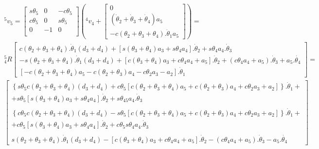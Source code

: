 \begin{equation}
\begin{gathered}
    ^5v_5 = \begin{bmatrix}
        s\theta_5 & 0 & -c\theta_5 \\
        c\theta_5 & 0 & s\theta_5 \\
        0 & -1 & 0 \\
    \end{bmatrix} \left( ^4v_4 + 
    \begin{bmatrix}
        0 \\ 
        (\dot{\theta}_2 + \dot{\theta}_3 + \dot{\theta}_4)a_5 \\ 
        -c(\theta_2+\theta_3+\theta_4).\dot{\theta}_1a_5
    \end{bmatrix} \right) = \\
    ^5_4R
    \begin{bmatrix}
        c(\theta_2 + \theta_3 + \theta_4).\dot{\theta}_1(d_3+d_4) + [s(\theta_3+\theta_4)a_3 + s\theta_4a_4].\dot{\theta}_2 + s\theta_4a_4.\dot{\theta}_3 \\ 
        -s(\theta_2 + \theta_3 + \theta_4).\dot{\theta}_1(d_3+d_4) + [c(\theta_3+\theta_4)a_3 + c\theta_4a_4 + a_5].\dot{\theta}_2 + (c\theta_4a_4 + a_5).\dot{\theta}_3 + a_5.\dot{\theta_4} \\ 
        [-c(\theta_2 + \theta_3 + \theta_4)a_5 - c(\theta_2 + \theta_3)a_4 - c\theta_2a_3 - a_2].\dot{\theta}_1
    \end{bmatrix} = \\
    \begin{bmatrix}
        \left\{s\theta_5c(\theta_2 + \theta_3 + \theta_4)(d_3+d_4) + c\theta_5[c(\theta_2 + \theta_3 + \theta_4)a_5 + c(\theta_2 + \theta_3)a_4 + c\theta_2a_3 + a_2]\right\}.\dot{\theta}_1 + \\
        + s\theta_5[s(\theta_3+\theta_4)a_3 + s\theta_4a_4].\dot{\theta}_2 + s\theta_{45}a_4.\dot{\theta}_3 \\ 
        \\
        \left\{c\theta_5c(\theta_2 + \theta_3 + \theta_4)(d_3+d_4) - s\theta_5[c(\theta_2 + \theta_3 + \theta_4)a_5 + c(\theta_2 + \theta_3)a_4 + c\theta_2a_3 + a_2]\right\}.\dot{\theta}_1 + \\
        + c\theta_5[s(\theta_3+\theta_4)a_3 + s\theta_4a_4].\dot{\theta}_2 + c\theta_5s\theta_4a_4.\dot{\theta}_3 \\ 
        \\
        s(\theta_2 + \theta_3 + \theta_4).\dot{\theta}_1(d_3+d_4) - [c(\theta_3+\theta_4)a_3 + c\theta_4a_4 + a_5].\dot{\theta}_2 - (c\theta_4a_4 + a_5).\dot{\theta}_3 - a_5.\dot{\theta_4}
    \end{bmatrix}
\end{gathered}
\end{equation}

